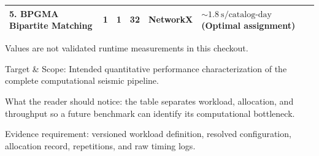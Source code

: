 \begin{landscape}
\begin{table}[htbp]
\begin{threeparttable}
\begin{tabularx}{\linewidth}{l c c c c X}
        5. \acs{BPGMA} Bipartite Matching & \num{1} & \num{1} &
        \num{32} & NetworkX & $\sim
        \qty{1.8}{\second} / \text{catalog-day}$ (Optimal assignment) \\
        \bottomrule
      \end{tabularx}
      \begin{tablenotes}[flushleft]
        \footnotesize
      \item[a] [Unverified Draft Value] Values are not validated
        runtime measurements in this checkout.
      \item Target \& Scope: Intended quantitative performance
        characterization of the complete computational seismic pipeline.
      \item What the reader should notice: the table separates
        workload, allocation, and throughput so a future benchmark can
        identify its computational bottleneck.
      \item Evidence requirement: versioned workload definition,
        resolved configuration, allocation record, repetitions, and
        raw timing logs.
      \end{tablenotes}
    \end{threeparttable}
  \end{table}
\end{landscape}

